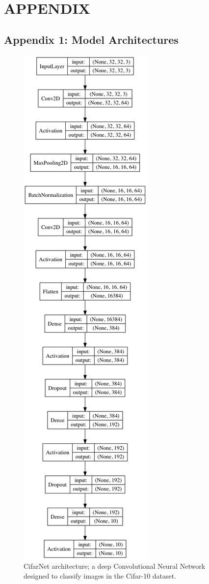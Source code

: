 \documentclass[letterpaper, 10 pt, conference]{ieeeconf}  %
\begin{document}
\section{APPENDIX}
\subsection{Appendix 1: Model Architectures}
\begin{figure}[H]
      \centering
      \includegraphics[scale = .3]{cifarnet_model.png}
		\centering
      \caption{CifarNet architecture; a deep Convolutional Neural Network designed to classify images in the Cifar-10 dataset.}
      \label{figurelabel}
\end{figure}
    
\end{document}
